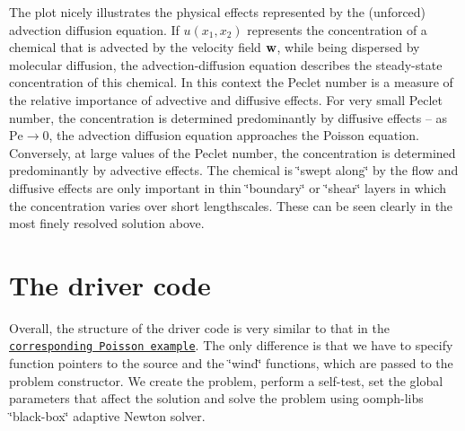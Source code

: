 The plot nicely illustrates the physical effects represented by the (unforced) advection diffusion equation. If $ u(x_1,x_2) $ represents the concentration of a chemical that is advected by the velocity field $ {\bf w}$, while being dispersed by molecular diffusion, the advection-\/diffusion equation describes the steady-\/state concentration of this chemical. In this context the Peclet number is a measure of the relative importance of advective and diffusive effects. For very small Peclet number, the concentration is determined predominantly by diffusive effects -- as $ \mbox{Pe} \to 0$, the advection diffusion equation approaches the Poisson equation. Conversely, at large values of the Peclet number, the concentration is determined predominantly by advective effects. The chemical is \char`\"{}swept along\char`\"{} by the flow and diffusive effects are only important in thin \char`\"{}boundary\char`\"{} or \char`\"{}shear\char`\"{} layers in which the concentration varies over short lengthscales. These can be seen clearly in the most finely resolved solution above.



 

\hypertarget{index_main}{}\section{The driver code}\label{index_main}
Overall, the structure of the driver code is very similar to that in the \href{../../../poisson/two_d_poisson/html/index.html}{\tt corresponding Poisson example}. The only difference is that we have to specify function pointers to the source and the \char`\"{}wind\char`\"{} functions, which are passed to the problem constructor. We create the problem, perform a self-\/test, set the global parameters that affect the solution and solve the problem using {\ttfamily oomph-\/lib\textquotesingle{}s} \char`\"{}black-\/box\char`\"{} adaptive Newton solver.

